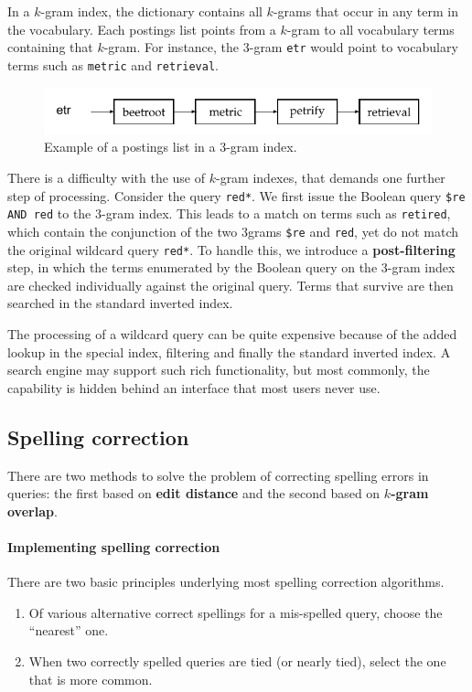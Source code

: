 \documentclass[letterpaper,11pt]{article}
\newcommand{\code}[1]{\texttt{#1}}
\begin{document}
In a $k$-gram index, the dictionary contains all $k$-grams that occur in any term in the vocabulary. Each postings list points from a $k$-gram to all vocabulary terms containing that $k$-gram. For instance, the 3-gram \code{etr} would point to vocabulary terms such as \code{metric} and \code{retrieval}.
\begin{figure}[H]
    \centering
    \includegraphics[scale=0.70]{sect3/figure_3_4.png}
    \caption{Example of a postings list in a 3-gram index.}
\end{figure}

There is a difficulty with the use of $k$-gram indexes, that demands one further step of processing. Consider the query \code{red*}. We first issue the Boolean query \code{\$re AND red} to the 3-gram index. This leads to a match on terms such as \code{retired}, which contain the conjunction of the two 3grams \code{\$re} and \code{red}, yet do not match the original wildcard query \code{red*}. To handle this, we introduce a \textbf{post-filtering} step, in which the terms enumerated by the Boolean query on the 3-gram index are checked individually against the original query. Terms that survive are then searched in the standard inverted index.

The processing of a wildcard query can be quite expensive because of the added lookup in the special index, filtering and finally the standard inverted index. A search engine may support such rich functionality, but most commonly, the capability is hidden behind an interface that most users never use.

\subsection{Spelling correction}
There are two methods to solve the problem of correcting spelling errors in queries: the first based on \textbf{edit distance} and the second based on \textbf{$k$-gram overlap}.

\paragraph{Implementing spelling correction}
There are two basic principles underlying most spelling correction algorithms.
\begin{enumerate}
    \item Of various alternative correct spellings for a mis-spelled query, choose the “nearest” one.
    \item When two correctly spelled queries are tied (or nearly tied), select the one that is more common.
\end{enumerate}
\end{document}
